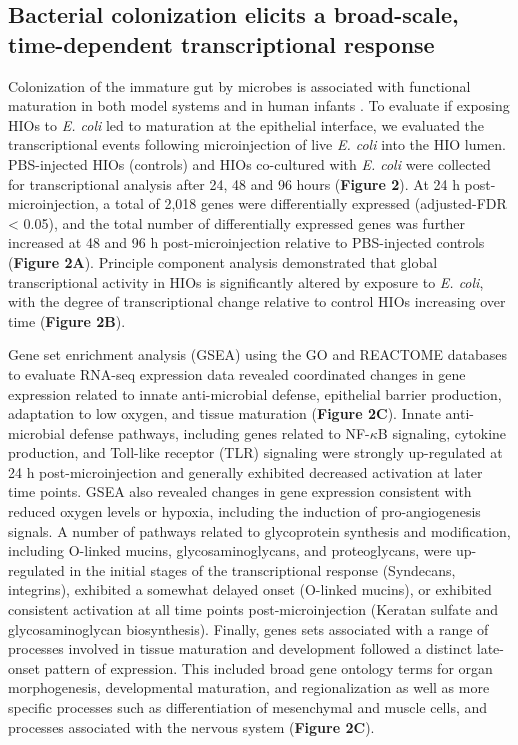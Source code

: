 \documentclass[9pt,lineo]{elife}
\begin{document}
\subsection*{{\bfseries\sffamily } Bacterial colonization elicits a broad-scale, time-dependent transcriptional response}
\label{sec:orgheadline4}
Colonization of the immature gut by microbes is associated with functional maturation in both model systems\citep{Kremer:2013,Sommer:2015,Broderick:2014,Erkosar:2015} and in human infants \citep{Renz:2012}. To evaluate if exposing HIOs to \emph{E. coli} led to maturation at the epithelial interface, we evaluated the transcriptional events following microinjection of live \emph{E. coli}  into the HIO lumen. PBS-injected HIOs (controls) and HIOs co-cultured with \emph{E. coli} were collected for transcriptional analysis after 24, 48 and 96 hours (\textbf{Figure 2}). At 24 h post-microinjection, a total of 2,018 genes were differentially expressed (adjusted-FDR < 0.05), and the total number of differentially expressed genes was further increased at 48 and 96 h post-microinjection relative to PBS-injected controls (\textbf{Figure 2A}). Principle component analysis demonstrated that global transcriptional activity in HIOs is significantly altered by exposure to \emph{E. coli}, with the degree of transcriptional change relative to control HIOs increasing over time (\textbf{Figure 2B}).

Gene set enrichment analysis (GSEA) \citep{Subramanian:2005} using the GO \citep{Ashburner:2000,Gene_Ontology_Consortium:2015} and REACTOME \citep{Croft:2014,Fabregat:2016} databases to evaluate RNA-seq expression data revealed coordinated changes in gene expression related to innate anti-microbial defense, epithelial barrier production, adaptation to low oxygen, and tissue maturation (\textbf{Figure 2C}). Innate anti-microbial defense pathways, including genes related to NF-\(\kappa\)B signaling, cytokine production, and Toll-like receptor (TLR) signaling were strongly up-regulated at 24 h post-microinjection and generally exhibited decreased activation at later time points. GSEA also revealed changes in gene expression consistent with reduced oxygen levels or hypoxia, including the induction of pro-angiogenesis signals. A number of pathways related to glycoprotein synthesis and modification, including O-linked mucins, glycosaminoglycans, and proteoglycans, were up-regulated in the initial stages of the transcriptional response (Syndecans, integrins), exhibited a somewhat delayed onset (O-linked mucins), or exhibited consistent activation at all time points post-microinjection (Keratan sulfate and glycosaminoglycan biosynthesis). Finally, genes sets associated with a range of processes involved in tissue maturation and development followed a distinct late-onset pattern of expression. This included broad gene ontology terms for organ morphogenesis, developmental maturation, and regionalization as well as more specific processes such as differentiation of mesenchymal and muscle cells, and processes associated with the nervous system (\textbf{Figure 2C}).
\end{document}
